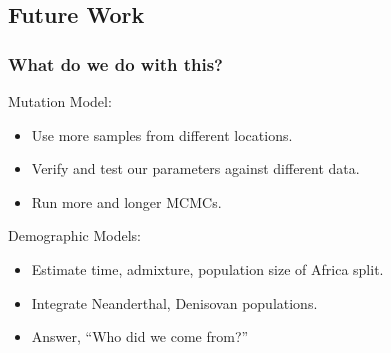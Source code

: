\documentclass[11pt]{beamer}
\begin{document}
    \subsection{Future Work}\label{subsec:fw}
    \begin{frame}
        \frametitle{What do we do with this?}
        \begin{block}{Mutation Model:}
            \begin{itemize}
                \item Use more samples from different locations.
                \item Verify and test our parameters against different data.
                \item Run more and longer MCMCs.
            \end{itemize}
        \end{block} \medskip

        \begin{block}{Demographic Models:}
            \begin{itemize}
                \item Estimate time, admixture, population size of Africa split.
                \item Integrate Neanderthal, Denisovan populations.
                \item Answer, ``Who did we come from?''
            \end{itemize}
        \end{block}

    \end{frame}
\end{document}
